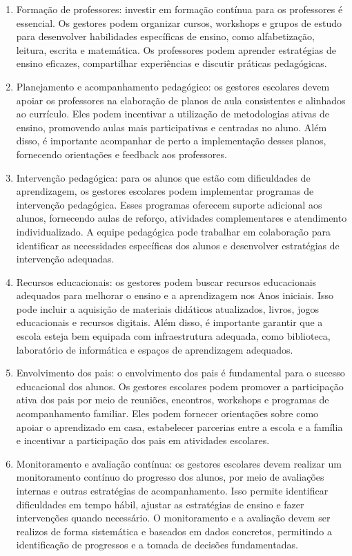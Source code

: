 \begin{enumerate}
\def\labelenumi{\arabic{enumi}.}
\setcounter{enumi}{1}
\item
  Formação de professores: investir em formação contínua para os
  professores é essencial. Os gestores podem organizar cursos, workshops
  e grupos de estudo para desenvolver habilidades específicas de ensino,
  como alfabetização, leitura, escrita e matemática. Os professores
  podem aprender estratégias de ensino eficazes, compartilhar
  experiências e discutir práticas pedagógicas.
\item
  Planejamento e acompanhamento pedagógico: os gestores escolares devem
  apoiar os professores na elaboração de planos de aula consistentes e
  alinhados ao currículo. Eles podem incentivar a utilização de
  metodologias ativas de ensino, promovendo aulas mais participativas e
  centradas no aluno. Além disso, é importante acompanhar de perto a
  implementação desses planos, fornecendo orientações e feedback aos
  professores.
\item
  Intervenção pedagógica: para os alunos que estão com dificuldades de
  aprendizagem, os gestores escolares podem implementar programas de
  intervenção pedagógica. Esses programas oferecem suporte adicional aos
  alunos, fornecendo aulas de reforço, atividades complementares e
  atendimento individualizado. A equipe pedagógica pode trabalhar em
  colaboração para identificar as necessidades específicas dos alunos e
  desenvolver estratégias de intervenção adequadas.
\item
  Recursos educacionais: os gestores podem buscar recursos educacionais
  adequados para melhorar o ensino e a aprendizagem nos Anos iniciais.
  Isso pode incluir a aquisição de materiais didáticos atualizados,
  livros, jogos educacionais e recursos digitais. Além disso, é
  importante garantir que a escola esteja bem equipada com
  infraestrutura adequada, como biblioteca, laboratório de informática e
  espaços de aprendizagem adequados.
\item
  Envolvimento dos pais: o envolvimento dos pais é fundamental para o
  sucesso educacional dos alunos. Os gestores escolares podem promover a
  participação ativa dos pais por meio de reuniões, encontros, workshops
  e programas de acompanhamento familiar. Eles podem fornecer
  orientações sobre como apoiar o aprendizado em casa, estabelecer
  parcerias entre a escola e a família e incentivar a participação dos
  pais em atividades escolares.
\item
  Monitoramento e avaliação contínua: os gestores escolares devem
  realizar um monitoramento contínuo do progresso dos alunos, por meio
  de avaliações internas e outras estratégias de acompanhamento. Isso
  permite identificar dificuldades em tempo hábil, ajustar as
  estratégias de ensino e fazer intervenções quando necessário. O
  monitoramento e a avaliação devem ser realizos de forma sistemática e
  baseados em dados concretos, permitindo a identificação de progressos
  e a tomada de decisões fundamentadas.
\end{enumerate}

